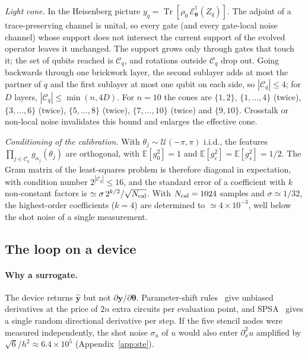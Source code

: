 \documentclass[floatfix,aps,pra,twocolumn,superscriptaddress,10pt,nofootinbib]{revtex4-2}
\begin{document}
\begin{appendices}
\emph{Light cone.} In the Heisenberg picture $y_q=\operatorname{Tr}[\rho_0\,\mathcal E^\dagger_{\bm\theta}(Z_q)]$. The adjoint of a trace-preserving channel is unital, so every gate (and every gate-local noise channel) whose support does not intersect the current support of the evolved operator leaves it unchanged. The support grows only through gates that touch it; the set of qubits reached is $\mathcal C_q$, and rotations outside $\mathcal C_q$ drop out. Going backwards through one brickwork layer, the second sublayer adds at most the partner of $q$ and the first sublayer at most one qubit on each side, so $|\mathcal C_q|\le4$; for $D$ layers, $|\mathcal C_q|\le\min(n,4D)$. For $n=10$ the cones are $\{1,2\}$, $\{1,\dots,4\}$ (twice), $\{3,\dots,6\}$ (twice), $\{5,\dots,8\}$ (twice), $\{7,\dots,10\}$ (twice) and $\{9,10\}$. Crosstalk or non-local noise invalidates this bound and enlarges the effective cone.

\emph{Conditioning of the calibration.} With $\theta_j\sim\mathcal U(-\pi,\pi)$ i.i.d., the features $\prod_{j\in\mathcal C_q}g_{\alpha_j}(\theta_j)$ are orthogonal, with $\mathbb E[g_0^2]=1$ and $\mathbb E[g_c^2]=\mathbb E[g_s^2]=1/2$. The Gram matrix of the least-squares problem is therefore diagonal in expectation, with condition number $2^{|\mathcal C_q|}\le16$, and the standard error of a coefficient with $k$ non-constant factors is $\simeq\sigma\,2^{k/2}/\sqrt{N_{\rm cal}}$. With $N_{\rm cal}=1024$ samples and $\sigma\simeq1/32$, the highest-order coefficients ($k=4$) are determined to $\simeq4\times10^{-3}$, well below the shot noise of a single measurement.

\subsection{The loop on a device}\label{app:hil}
\paragraph{Why a surrogate.} The device returns $\hat{\bm y}$ but not $\partial\bm y/\partial\bm\theta$. Parameter-shift rules~\cite{mitarai2018quantum,schuld2019evaluating,wierichs2022general} give unbiased derivatives at the price of $2n$ extra circuits per evaluation point, and SPSA~\cite{spall1992multivariate,kandala2017hardware} gives a single random directional derivative per step. If the five stencil nodes were measured independently, the shot noise $\sigma_u$ of $u$ would also enter $\partial_x^2u$ amplified by $\sqrt6/h^2\approx6.4\times10^5$ (Appendix~\ref{app:ste}).


\end{appendices}
\end{document}
